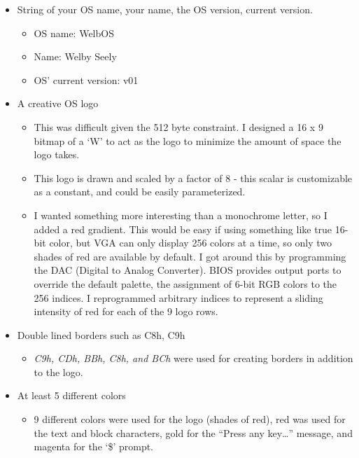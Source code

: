 \documentclass{article}
\begin{document}
    \begin{itemize}
        \item String of your OS name, your name, the OS version, current version.
            \begin{itemize}
                \item OS name: WelbOS
                \item Name: Welby Seely
                \item OS' current version: v01
            \end{itemize}
        \item A creative OS logo
            \begin{itemize}
                \item This was difficult given the 512 byte constraint.
                I designed a 16 x 9 bitmap of a `W' to act as the logo to minimize the amount of space the logo takes.
                \item This logo is drawn and scaled by a factor of 8 - this scalar is customizable as a constant, and could be easily parameterized.
                \item I wanted something more interesting than a monochrome letter, so I added a red gradient.
                This would be easy if using something like true 16-bit color, but VGA can only display 256 colors at a time, so only two shades of red are available by default.
                I got around this by programming the DAC (Digital to Analog Converter).
                BIOS provides output ports to override the default palette, the assignment of 6-bit RGB colors to the 256 indices.
                I reprogrammed arbitrary indices to represent a sliding intensity of red for each of the 9 logo rows.
            \end{itemize}
        \item Double lined borders such as C8h, C9h
            \begin{itemize}
                \item \textit{C9h, CDh, BBh, C8h, and BCh} were used for creating borders in addition to the logo.
            \end{itemize}
        \item At least 5 different colors
            \begin{itemize}
                \item 9 different colors were used for the logo (shades of red), red was used for the text and block characters, gold for the ``Press any key\ldots'' message, and magenta for the `\$' prompt.

\end{itemize}
\end{itemize}
\end{document}
